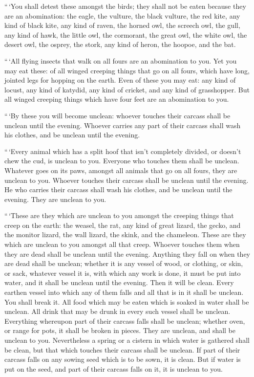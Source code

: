  ``\,`You shall detest these amongst the birds; they shall
not be eaten because they are an abomination: the eagle, the vulture,
the black vulture,  the red kite, any kind of black kite,
 any kind of raven,  the horned owl, the
screech owl, the gull, any kind of hawk,  the little owl,
the cormorant, the great owl,  the white owl, the desert
owl, the osprey,  the stork, any kind of heron, the hoopoe,
and the bat.

 ``\,`All flying insects that walk on all fours are an
abomination to you.  Yet you may eat these: of all winged
creeping things that go on all fours, which have long, jointed legs for
hopping on the earth.  Even of these you may eat: any kind
of locust, any kind of katydid, any kind of cricket, and any kind of
grasshopper.  But all winged creeping things which have
four feet are an abomination to you.

 ``\,`By these you will become unclean: whoever touches
their carcass shall be unclean until the evening.  Whoever
carries any part of their carcass shall wash his clothes, and be unclean
until the evening.

 ``\,`Every animal which has a split hoof that isn't
completely divided, or doesn't chew the cud, is unclean to you. Everyone
who touches them shall be unclean.  Whatever goes on its
paws, amongst all animals that go on all fours, they are unclean to you.
Whoever touches their carcass shall be unclean until the evening.
 He who carries their carcass shall wash his clothes, and
be unclean until the evening. They are unclean to you.

 ``\,`These are they which are unclean to you amongst the
creeping things that creep on the earth: the weasel, the rat, any kind
of great lizard,  the gecko, and the monitor lizard, the
wall lizard, the skink, and the chameleon.  These are they
which are unclean to you amongst all that creep. Whoever touches them
when they are dead shall be unclean until the evening. 
Anything they fall on when they are dead shall be unclean; whether it is
any vessel of wood, or clothing, or skin, or sack, whatever vessel it
is, with which any work is done, it must be put into water, and it shall
be unclean until the evening. Then it will be clean.  Every
earthen vessel into which any of them falls and all that is in it shall
be unclean. You shall break it.  All food which may be
eaten which is soaked in water shall be unclean. All drink that may be
drunk in every such vessel shall be unclean.  Everything
whereupon part of their carcass falls shall be unclean; whether oven, or
range for pots, it shall be broken in pieces. They are unclean, and
shall be unclean to you.  Nevertheless a spring or a
cistern in which water is gathered shall be clean, but that which
touches their carcass shall be unclean.  If part of their
carcass falls on any sowing seed which is to be sown, it is clean.
 But if water is put on the seed, and part of their carcass
falls on it, it is unclean to you.

